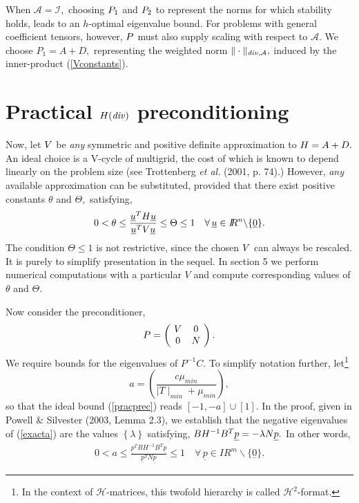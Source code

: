 \documentclass{imamci}
\numberwithin{equation}{section}
\begin{document}
\noindent When $\mathcal{A}=\mathcal{I},$ choosing $\mathnormal{P}_{1}$ and
$\mathnormal{P}_{2}$ to represent the norms for which stability holds, leads
to an $h$-optimal eigenvalue bound. For problems with general coefficient
tensors, however, $\mathnormal{P}$ must also supply scaling with respect
to $\mathcal{A}$. We choose $P_{1} = A+D,$ representing the weighted norm
$\| \cdot \|_{{\it div}, \mathcal{A}},$ induced by the inner-product (\ref{Vconstants}).

\section{Practical $H({\it div})$ preconditioning} 

Now, let $\mathnormal{V}$ be \textit{any} symmetric and positive
definite approximation to $\mathnormal{H}=A+D.$ An ideal choice is a V-cycle
of multigrid, the cost of which is known to depend linearly on the problem
size (see Trottenberg {\it et al.} (2001, p. 74).) However, \textit{any} available approximation
can be substituted, provided that there exist positive constants $\theta$
and $\Theta,$ satisfying,
\begin{eqnarray}\label{Vconstants}
0 < \theta \le \frac{\underline{u}^{T}\mathnormal{H}\underline{u}}{\underline{u}^{T}
\mathnormal{V}\underline{u}} \le  \Theta \le  1  \quad \forall\, \underline{u} \in I\!\!R^{n}\backslash\{\underline{0}\}. 
\end{eqnarray}
The condition $\Theta \le 1$ is not restrictive, since the chosen $\mathnormal{V}$
can always be rescaled. It is purely to simplify presentation in the sequel.
In section 5 we perform numerical computations with a particular $V$ and
compute corresponding values of $\theta$ and $\Theta.$ 

Now consider the preconditioner,
\begin{equation}\label{pracprec}
P= \left(\begin{array}{@{\ }cc@{\ }}
\mathnormal{V}& 0 \\
0 & \mathnormal{N} 
\end{array}\right).
\end{equation}
We require bounds for the eigenvalues of $P^{-1}C.$ To simplify notation
further, let\footnote{In the context of $\mathscr{H}$-matrices, this twofold hierarchy is called $\mathscr{H}^{2}$-format.}
\begin{equation}\label{exacta}
a = \left(\frac{c\mu_{min}}{\mid T \mid_{min}  + \mu_{min}}\right), 
\end{equation}
so that the ideal bound (\ref{pracprec}) reads $[-1, -a] \cup [1]$. In the
proof, given in Powell \& Silvester (2003, Lemma 2.3), we establish that the negative
eigenvalues of (\ref{exacta}) are the values $\left\{ \lambda \right\}$
satisfying, $BH^{-1}\break B^{T}\underline{p} = - \lambda N \underline{p}.$ In other
words,
\begin{eqnarray}\label{newadded}
 0 < a  \le  \frac{\underline{p}^{T}BH^{-1}B^{T}\underline{p}}{\underline{p}^{T}N
\underline{p}} \le  1 \quad \forall \, \underline{p} \in I\!\!R^{m}\backslash\{\underline{0}\}.
\end{eqnarray}
\end{document}
